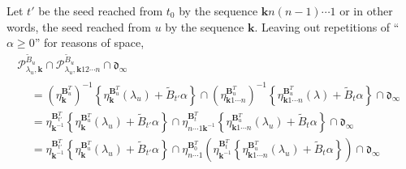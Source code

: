 \documentclass{amsart}
\theoremstyle{definition}
\theoremstyle{remark}
\numberwithin{equation}{section}
\newcommand{\set}[1]{{\left\lbrace #1 \right\rbrace}}
\newcommand{\0}{{\mathbf{0}}}
\newcommand{\kk}{\mathbf{k}}
\newcommand{\tB}{{\tilde{B}}}
\newcommand{\BB}{\mathbf{B}}
\renewcommand{\P}{\mathcal{P}}
\renewcommand{\d}{{\mathfrak d}}
\begin{document}
Let $t'$ be the seed reached from $t_0$ by the sequence $\kk n(n-1)\cdots1$ or in other words, the seed reached from $u$ by the sequence $\kk$.
Leaving out repetitions of ``$\alpha\ge0$'' for reasons of space,
\begin{multline*}
\P_{\lambda_u,\kk}^{\tB_u}
\cap
\P_{\lambda_u,\kk12\cdots n}^{\tB_u}
\cap
\d_\infty\\
\begin{aligned}
&=
\left(\eta_{\kk}^{\BB_u^T}\right)^{-1}\!\!\set{\eta_{\kk}^{\BB_u^T}(\lambda_u)+\tB_{t'}\alpha}
\cap
\left(\eta_{\kk1\cdots n}^{\BB_u^T}\right)^{-1}\!\!\set{\eta_{\kk1\cdots n}^{\BB_u^T}(\lambda)+\tB_t\alpha}
\cap
\d_\infty\\&=
\eta_{\kk^{-1}}^{\BB_{t'}^T}\set{\eta_{\kk}^{\BB_u^T}(\lambda_u)+\tB_{t'}\alpha}
\cap
\eta_{n\cdots1\kk^{-1}}^{\BB_t^T}\set{\eta_{\kk1\cdots n}^{\BB_u^T}(\lambda_u)+\tB_t\alpha}
\cap
\d_\infty\\&=
\eta_{\kk^{-1}}^{\BB_{t'}^T}\set{\eta_{\kk}^{\BB_u^T}(\lambda_u)+\tB_{t'}\alpha}
\cap
\eta_{n\cdots1}^{\BB_0^T}\left(\eta_{\kk^{-1}}^{\BB_t^T}\set{\eta_{\kk1\cdots n}^{\BB_u^T}(\lambda_u)+\tB_t\alpha}\right)
\cap
\d_\infty %
\end{aligned}
\end{multline*}
\end{document}
